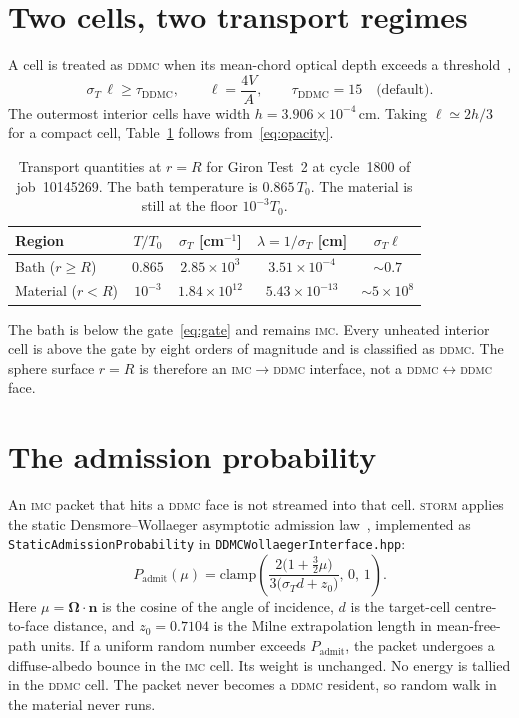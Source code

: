 \documentclass[11pt]{article}
\newcommand{\imc}{\textsc{imc}}
\newcommand{\ddmc}{\textsc{ddmc}}
\newcommand{\storm}{\textsc{storm}}
\begin{document}
\section{Two cells, two transport regimes}

A cell is treated as \ddmc{} when its mean-chord optical depth exceeds a threshold~\cite{densmore2012},
\begin{equation}
  \sigma_T\,\ell \ge \tau_{\mathrm{DDMC}},
  \qquad
  \ell = \frac{4V}{A},
  \qquad
  \tau_{\mathrm{DDMC}}=15
  \quad\text{(default)}.
  \label{eq:gate}
\end{equation}
The outermost interior cells have width $h=3.906\times 10^{-4}\,\mathrm{cm}$.
Taking $\ell\simeq 2h/3$ for a compact cell, Table~\ref{tab:two} follows from~\eqref{eq:opacity}.

\begin{table}[ht]
\centering
\caption{Transport quantities at $r=R$ for Giron Test~2 at cycle~1800 of job~10145269.
The bath temperature is $0.865\,T_0$.
The material is still at the floor $10^{-3}T_0$.}
\label{tab:two}
\begin{tabular}{@{}lcccc@{}}
\toprule
Region & $T/T_0$ & $\sigma_T$ [cm$^{-1}$] & $\lambda=1/\sigma_T$ [cm] & $\sigma_T\ell$ \\
\midrule
Bath ($r\ge R$) & $0.865$ & $2.85\times 10^{3}$ & $3.51\times 10^{-4}$ & $\sim 0.7$ \\
Material ($r<R$) & $10^{-3}$ & $1.84\times 10^{12}$ & $5.43\times 10^{-13}$ & $\sim 5\times 10^{8}$ \\
\bottomrule
\end{tabular}
\end{table}

The bath is below the gate~\eqref{eq:gate} and remains \imc{}.
Every unheated interior cell is above the gate by eight orders of magnitude and is classified as \ddmc{}.
The sphere surface $r=R$ is therefore an \imc$\to$\ddmc{} interface, not a \ddmc$\leftrightarrow$\ddmc{} face.

\section{The admission probability}

An \imc{} packet that hits a \ddmc{} face is not streamed into that cell.
\storm{} applies the static Densmore--Wollaeger asymptotic admission law~\cite{densmore2012,wollaeger2013}, implemented as \texttt{StaticAdmissionProbability} in \texttt{DDMCWollaegerInterface.hpp}:
\begin{equation}
  P_{\mathrm{admit}}(\mu)
  =
  \mathrm{clamp}\!\left(
    \frac{2\bigl(1+\tfrac{3}{2}\mu\bigr)}
         {3\bigl(\sigma_T d + z_0\bigr)}
  ,\, 0,\, 1\right).
  \label{eq:admit}
\end{equation}
Here $\mu=\bm{\Omega}\cdot\bm{n}$ is the cosine of the angle of incidence, $d$ is the target-cell centre-to-face distance, and $z_0=0.7104$ is the Milne extrapolation length in mean-free-path units.
If a uniform random number exceeds $P_{\mathrm{admit}}$, the packet undergoes a diffuse-albedo bounce in the \imc{} cell.
Its weight is unchanged.
No energy is tallied in the \ddmc{} cell.
The packet never becomes a \ddmc{} resident, so random walk in the material never runs.
\end{document}
